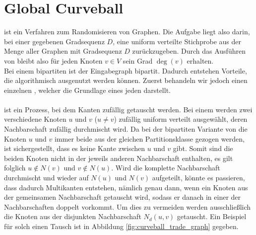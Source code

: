 \section{Global Curveball }
\label{sec:global_curveball}
\gc{} ist ein Verfahren zum Randomisieren von Graphen.
Die Aufgabe liegt also darin, bei einer gegebenen Gradsequenz $D$, eine uniform verteilte Stichprobe
aus der Menge aller Graphen mit Gradsequenz $D$ zurückzugeben. Durch das Ausführen von \gc{} 
bleibt also für jeden Knoten $v\in V$ sein Grad $\deg(v)$ erhalten. 
\\
Bei einem bipartiten \gc{} ist der Eingabegraph bipartit. Dadurch entstehen 
Vorteile, die algorithmisch ausgenutzt werden können. Zuerst behandeln wir jedoch einen einzelnen \cb{}, welcher
die Grundlage eines jeden \gc{} darstellt.
\\
\\
\fett{\cb{}} ist  ein Prozess, bei dem Kanten zufällig getauscht werden. Bei einem \ct{} werden
zwei verschiedene Knoten $u$ und $v$ ($u\neq v$) zufällig uniform verteilt ausgewählt, deren Nachbarschaft
zufällig durchmischt wird. Da bei der bipartiten Variante  von \cb{}
die Knoten $u$ und $v$ immer beide aus der gleichen Partitionsklasse gezogen werden, ist sichergestellt, dass
es keine Kante zwischen $u$ und $v$ gibt. Somit sind die beiden Knoten nicht in der jeweils anderen Nachbarschaft
enthalten, es gilt folglich $u\notin N(v)$ und $v\notin N(u)$.
Wird die komplette Nachbarschaft  durchmischt und wieder auf $ N(u)$ und $N(v)$ 
aufgeteilt, könnte es passieren, 
dass dadurch Multikanten entstehen,  
nämlich genau dann, wenn ein Knoten aus der gemeinsamen Nachbarschaft getauscht wird, sodass er danach in 
einer der Nachbarschaften doppelt vorkommt.
Um dies zu vermeiden werden ausschließlich die Knoten aus der disjunkten Nachbarschaft $N_{d}(u,v)$ getauscht.
Ein Beispiel für solch einen Tausch ist in Abbildung \ref{fig:curveball_trade_graph} gegeben.
%
%
%
